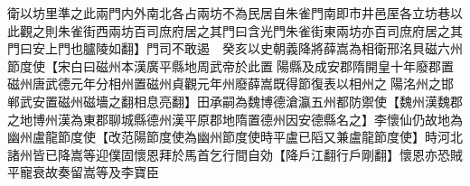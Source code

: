 衛以坊里準之此兩門内外南北各占兩坊不為民居自朱雀門南即市井邑厔各立坊巷以此觀之則朱雀街西兩坊百司庶府居之其門曰含光門朱雀街東兩坊亦百司庶府居之其門曰安上門也臚陵如翻】門司不敢遏　癸亥以史朝義降將薛嵩為相衛邢洺貝磁六州節度使【宋白曰磁州本漢廣平縣地周武帝於此置陽縣及成安郡隋開皇十年廢郡置磁州唐武德元年分相州置磁州貞觀元年州廢薛嵩既得節復表以相州之陽洺州之邯郸武安置磁州磁墻之翻相息亮翻】田承嗣為魏博德滄瀛五州都防禦使【魏州漢魏郡之地博州漢為東郡聊城縣德州漢平原郡地隋置德州因安德縣名之】李懷仙仍故地為幽州盧龍節度使【改范陽節度使為幽州節度使時平盧已䧟又兼盧龍節度使】時河北諸州皆已降嵩等迎僕固懷恩拜於馬首乞行間自効【降戶江翻行戶剛翻】懷恩亦恐賊平寵衰故奏留嵩等及李寶臣